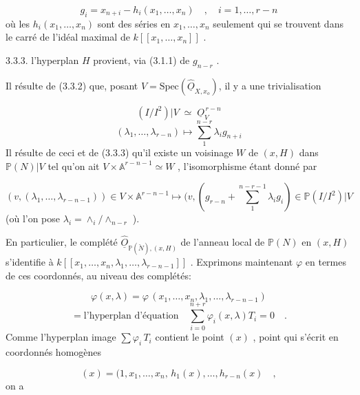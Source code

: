 \begin{equation*}
g_i = x_{n+i} - h_i(x_1,\dots,x_n) \quad , \quad i = 1,\dots,r-n
\end{equation*}
où les $h_i(x_1,\dots,x_n)$ sont des séries en $x_1,\dots,x_n$ seulement qui se trouvent dans le carré de l'idéal maximal de $k[[x_1,\dots,x_n]]$ .

3.3.3.  l'hyperplan $H$ provient, via (3.1.1) de $g_{n-r}$ .

Il résulte de (3.3.2) que, posant $V = \mathrm{Spec}(\hat{\underline{O}}_{X,x_o})$, il y a une trivialisation

\begin{equation*}
(I/I^2)|V \;\simeq\; \underline{O}_V^{\,r-n}
\end{equation*}
\begin{equation}\tag{3.3.4}
(\lambda_1,\dots,\lambda_{r-n}) \longmapsto \sum_1^{n-r} \lambda_i g_{n+i}
\end{equation}
Il résulte de ceci et de (3.3.3) qu'il existe un voisinage $W$ de $(x, H)$
dans $\mathbb{P}(N)|V$ tel qu'on ait $V \times \mathbb{A}^{r-n-1} \simeq W$ , l'isomorphisme étant donné par

\begin{equation}\tag{3.3.5}
(v,(\lambda_1,\dots,\lambda_{r-n-1})) \in V\times\mathbb{A}^{r-n-1} \longmapsto (v,(g_{r-n}+ \sum_1^{n-r-1} \lambda_i g_i) \in \mathbb{P}(I/I^2)|V
\end{equation}
(où l'on pose $\lambda_i = \wedge_i / \wedge_{n-r}$ ).

En particulier, le complété $\hat{\underline{O}}_{\mathbb{P}(\check{N}),(x,H)}$ de l'anneau local de $\mathbb{P}(N)$ en $(x, H)$ s'identifie à $k[[x_1,\dots,x_n,\lambda_1,\dots,\lambda_{r-n-1}]]$ . Exprimons maintenant $\varphi$ en termes de ces coordonnés, au niveau des complétés:

\begin{equation}\tag{3.3.6}
\varphi(x,\lambda) = \varphi\, (x_1,\dots,x_n,\lambda_1,\dots,\lambda_{r-n-1})
\end{equation}
\begin{equation*}
= \mbox{l'hyperplan d'équation} \quad \sum_{i=0}^{n+r} \varphi_i(x,\lambda)T_i = 0 \quad .
\end{equation*}
Comme l'hyperplan image $\sum \varphi_i\, T_i$ contient le point $(x)$ , point qui s'écrit en coordonnés homogènes

\begin{equation}\tag{3.3.7}
(x) = (1,x_1,\dots,x_n,\, h_1(x),\dots,h_{r-n}(x) \quad ,
\end{equation}
on a

